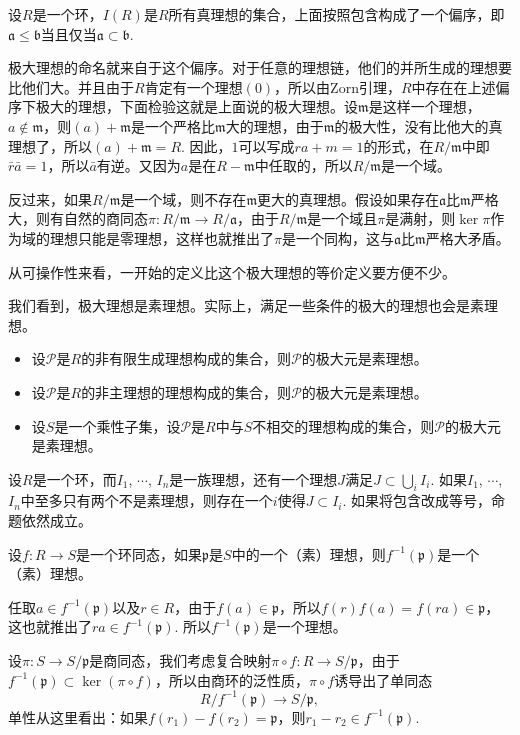 \para 设$R$是一个环，$I(R)$是$R$所有真理想的集合，上面按照包含构成了一个偏序，即$\mathfrak{a}\leq \mathfrak{b}$当且仅当$\mathfrak{a}\subset \mathfrak{b}$.

极大理想的命名就来自于这个偏序。对于任意的理想链，他们的并所生成的理想要比他们大。并且由于$R$肯定有一个理想$(0)$，所以由Zorn引理，$R$中存在在上述偏序下极大的理想，下面检验这就是上面说的极大理想。设$\mathfrak{m}$是这样一个理想，$a\notin \mathfrak{m}$，则$(a)+\mathfrak{m}$是一个严格比$\mathfrak{m}$大的理想，由于$\mathfrak{m}$的极大性，没有比他大的真理想了，所以$(a)+\mathfrak{m}=R$. 因此，$1$可以写成$ra+m=1$的形式，在$R/\mathfrak{m}$中即$\bar{r}\bar{a}=1$，所以$\bar{a}$有逆。又因为$a$是在$R-\mathfrak{m}$中任取的，所以$R/\mathfrak{m}$是一个域。

反过来，如果$R/\mathfrak{m}$是一个域，则不存在$\mathfrak{m}$更大的真理想。假设如果存在$\mathfrak{a}$比$\mathfrak{m}$严格大，则有自然的商同态$\pi:R/\mathfrak{m}\to R/\mathfrak{a}$，由于$R/\mathfrak{m}$是一个域且$\pi$是满射，则$\ker \pi$作为域的理想只能是零理想，这样也就推出了$\pi$是一个同构，这与$\mathfrak{a}$比$\mathfrak{m}$严格大矛盾。

从可操作性来看，一开始的定义比这个极大理想的等价定义要方便不少。

\para 我们看到，极大理想是素理想。实际上，满足一些条件的极大的理想也会是素理想。
\begin{itemize}
\item 设$\mathcal{P}$是$R$的非有限生成理想构成的集合，则$\mathcal{P}$的极大元是素理想。
\item 设$\mathcal{P}$是$R$的非主理想的理想构成的集合，则$\mathcal{P}$的极大元是素理想。
\item 设$S$是一个乘性子集，设$\mathcal{P}$是$R$中与$S$不相交的理想构成的集合，则$\mathcal{P}$的极大元是素理想。
\end{itemize}

\pro 设$R$是一个环，而$I_1$, $\cdots$, $I_n$是一族理想，还有一个理想$J$满足$J\subset \bigcup_i I_i$. 如果$I_1$, $\cdots$, $I_n$中至多只有两个不是素理想，则存在一个$i$使得$J\subset I_i$. 如果将包含改成等号，命题依然成立。\notprove

\para 设$f:R\to S$是一个环同态，如果$\mathfrak{p}$是$S$中的一个（素）理想，则$f^{-1}(\mathfrak{p})$是一个（素）理想。

\proof
	任取$a\in f^{-1}(\mathfrak{p})$以及$r\in R$，由于$f(a)\in \mathfrak{p}$，所以$f(r)f(a)=f(ra)\in \mathfrak{p}$，这也就推出了$ra\in f^{-1}(\mathfrak{p})$. 所以$f^{-1}(\mathfrak{p})$是一个理想。

	设$\pi:S\to S/\mathfrak{p}$是商同态，我们考虑复合映射$\pi\circ f:R\to S/\mathfrak{p}$，由于$f^{-1}(\mathfrak{p})\subset \ker(\pi\circ f)$，所以由商环的泛性质，$\pi\circ f$诱导出了单同态\[R/f^{-1}(\mathfrak{p})\to S/\mathfrak{p},\]
	单性从这里看出：如果$f(r_1)-f(r_2)=\mathfrak{p}$，则$r_1-r_2\in f^{-1}(\mathfrak{p})$. 

